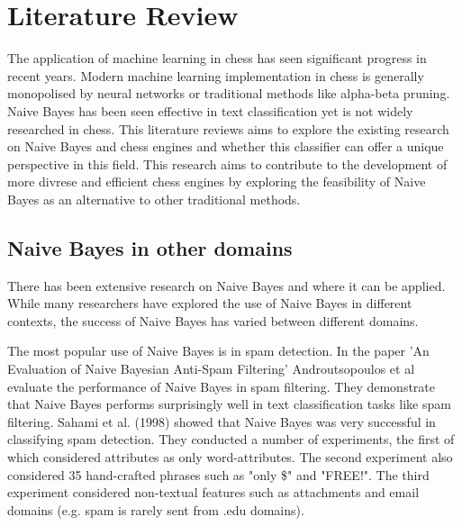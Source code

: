 \chapter{Literature Review}

The application of machine learning in chess has seen significant progress in recent years. Modern machine learning implementation in chess is generally monopolised by neural networks or traditional methods like alpha-beta pruning. Naive Bayes has been seen effective in text classification yet is not widely researched in chess. This literature reviews aims to explore the existing research on Naive Bayes and chess engines and whether this classifier can offer a unique perspective in this field. This research aims to contribute to the development of more divrese and efficient chess engines by exploring the feasibility of Naive Bayes as an alternative to other traditional methods.


\section{Naive Bayes in other domains}
There has been extensive research on Naive Bayes and where it can be applied. While many researchers have explored the use of Naive Bayes in different contexts, the success of Naive Bayes has varied between different domains.

The most popular use of Naive Bayes is in spam detection. In the paper 'An Evaluation of Naive Bayesian Anti-Spam Filtering'  Androutsopoulos et al \cite{androutsopoulosEvaluationNaiveBayesian2000} evaluate the performance of Naive Bayes in spam filtering. They demonstrate that Naive Bayes performs surprisingly well in text classification tasks like spam filtering. Sahami et al. (1998) \cite{sahamiBayesianApproachFiltering} showed that Naive Bayes was very successful in classifying spam detection. They conducted a number of experiments, the first of which considered attributes as only word-attributes. The second experiment also considered 35 hand-crafted phrases such as "only \$" and "FREE!". The third experiment considered non-textual features such as attachments and email domains (e.g. spam is rarely sent from .edu domains). 



